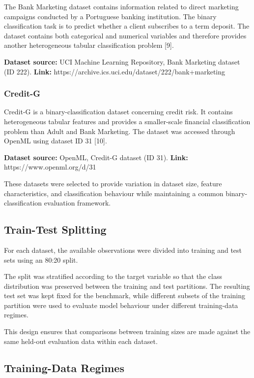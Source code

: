 The Bank Marketing dataset contains information related to direct marketing campaigns conducted by a Portuguese banking institution. The binary classification task is to predict whether a client subscribes to a term deposit. The dataset contains both categorical and numerical variables and therefore provides another heterogeneous tabular classification problem {[}9{]}.

\textbf{Dataset source:} UCI Machine Learning Repository, Bank Marketing dataset (ID 222). \textbf{Link:} https://archive.ics.uci.edu/dataset/222/bank+marketing

\subsubsection{Credit-G}\label{credit-g}

Credit-G is a binary-classification dataset concerning credit risk. It contains heterogeneous tabular features and provides a smaller-scale financial classification problem than Adult and Bank Marketing. The dataset was accessed through OpenML using dataset ID 31 {[}10{]}.

\textbf{Dataset source:} OpenML, Credit-G dataset (ID 31). \textbf{Link:} https://www.openml.org/d/31

These datasets were selected to provide variation in dataset size, feature characteristics, and classification behaviour while maintaining a common binary-classification evaluation framework.

\subsection{Train-Test Splitting}\label{train-test-splitting}

For each dataset, the available observations were divided into training and test sets using an 80:20 split.

The split was stratified according to the target variable so that the class distribution was preserved between the training and test partitions. The resulting test set was kept fixed for the benchmark, while different subsets of the training partition were used to evaluate model behaviour under different training-data regimes.

This design ensures that comparisons between training sizes are made against the same held-out evaluation data within each dataset.

\subsection{Training-Data Regimes}\label{training-data-regimes}

